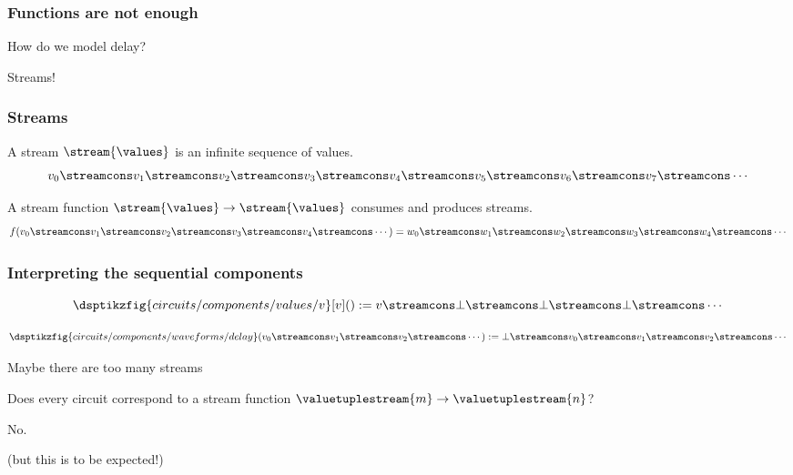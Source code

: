 \begin{frame}
        \frametitle{Functions are not enough}

        \centering
        \LARGE
        How do we model \alert{delay}?

        \wait
        \alert{Streams!}
\end{frame}
\begin{frame}
    \frametitle{Streams}

    A \alert{stream} \(\stream{\values}\) is an infinite sequence of values.
    \[
        v_0
        \streamcons
        v_1
        \streamcons
        v_2
        \streamcons
        v_3
        \streamcons
        v_4
        \streamcons
        v_5
        \streamcons
        v_6
        \streamcons
        v_7
        \streamcons
        \cdots
    \]

    \wait
    A \alert{stream function} \(\stream{\values} \to \stream{\values}\) consumes and
    produces streams.
    \[
        f(
            v_0
            \streamcons
            v_1
            \streamcons
            v_2
            \streamcons
            v_3
            \streamcons
            v_4
            \streamcons
            \cdots
        ) =
        w_0
        \streamcons
        w_1
        \streamcons
        w_2
        \streamcons
        w_3
        \streamcons
        w_4
        \streamcons
        \cdots
    \]
\end{frame}
\begin{frame}
    \frametitle{Interpreting the sequential components}
    \[
        \dsptikzfig{circuits/components/values/v}[v]()
        :=
        v \streamcons \bot \streamcons \bot \streamcons \bot \streamcons \cdots
    \]

    \wait
    \vspace{1em}

    \[
        \dsptikzfig{circuits/components/waveforms/delay}(
            v_0 \streamcons v_1 \streamcons v_2 \streamcons \cdots
        )
        :=
        \bot \streamcons v_0 \streamcons v_1 \streamcons v_2 \streamcons \cdots
    \]
\end{frame}
\begin{frame}{Maybe there are too many streams}

    \centering
    \LARGE
    Does every circuit correspond to a stream function \(
        \valuetuplestream{m} \to \valuetuplestream{n}
    \)?

    \Huge
    No.

    \scriptsize
    \wait
    (but this is to be expected!)
\end{frame}
